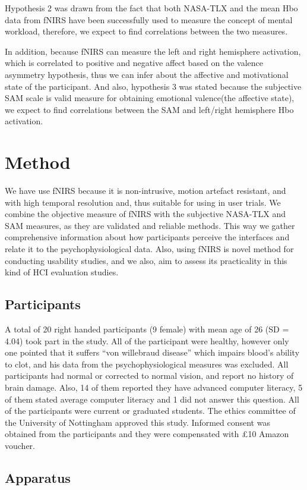 \documentclass[a4paper]{report}
\begin{document}
	Hypothesis 2 was drawn from the fact that both NASA-TLX and the mean Hbo data from fNIRS have been successfully used to measure the concept of mental workload, therefore, we expect to find correlations between the two measures.
	
	In addition, because fNIRS can measure the left and right hemisphere activation, which is correlated to positive and negative affect based on the valence asymmetry hypothesis, thus we can infer about the affective and motivational state of the participant. And also, hypothesis 3 was stated because the subjective SAM scale is valid measure for obtaining emotional valence(the affective state), we expect to find correlations between the SAM and left/right hemisphere Hbo activation.
	
	
	\section{Method}
	We have use fNIRS because it is non-intrusive, motion artefact resistant, and with high temporal resolution and, thus suitable for using in user trials. We combine the objective measure of fNIRS with the subjective NASA-TLX and SAM measures, as they are validated and reliable methods. This way we gather comprehensive information about how participants perceive the interfaces and relate it to the psychophysiological data. Also, using fNIRS is novel method for conducting usability studies, and we also, aim to assess its practicality in this kind of HCI evaluation studies.

		\subsection{Participants}
		A total of 20 right handed participants (9 female) with mean age of 26 (SD = 4.04) took part in the study. All of the participant were healthy, however only one pointed that it suffers ``von willebraud disease'' which impairs blood's ability to clot, and his data from the psychophysiological measures was excluded. All participants had normal or corrected to normal vision, and report no history of brain damage. Also, 14 of them reported they have advanced computer literacy, 5 of them stated average computer literacy and 1 did not answer this question. All of the participants were current or graduated students. The ethics committee of the University of Nottingham approved this study. Informed consent was obtained from the participants and they were compensated with £10 Amazon voucher.
		\subsection{Apparatus}
\end{document}
